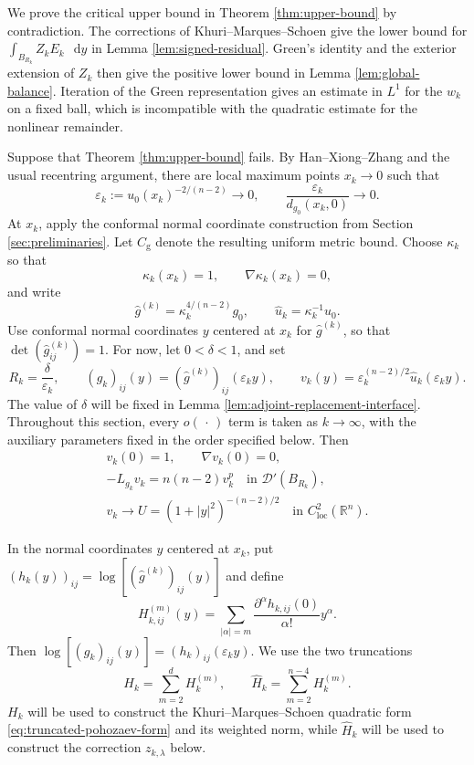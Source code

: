 \documentclass[11pt]{article}
\numberwithin{equation}{section}
\theoremstyle{remark}
\newcommand{\R}{\mathbb R}
\newcommand{\dd}{\mathop{}\!\mathrm{d}}
\begin{document}
{
We prove the critical upper bound in
Theorem  \ref{thm:upper-bound} by contradiction. The corrections of
Khuri--Marques--Schoen give the lower bound for
\(\int_{B_{R_k}}Z_kE_k\,\dd y\) in
Lemma  \ref{lem:signed-residual}. Green's identity and the exterior
extension of \(Z_k\) then give the positive lower bound in
Lemma  \ref{lem:global-balance}. Iteration of the Green representation
gives an estimate in \(L^1\) for the \(w_k\) on a fixed ball, which is
incompatible with the quadratic estimate for the nonlinear remainder.

Suppose that Theorem  \ref{thm:upper-bound} fails.  By
Han--Xiong--Zhang \cite[Lemma  2.2]{HanXiongZhang} and the usual recentring
argument, there are local maximum points \(x_k\to0\) such that
\[
 \varepsilon_k:=u_0(x_k)^{-2/(n-2)}\to0,
 \qquad
 \frac{\varepsilon_k}{d_{g_0}(x_k,0)}\to0.
\]
At \(x_k\), apply the conformal normal coordinate construction from
Section  \ref{sec:preliminaries}.  Let \(C_{\mathrm g}\)
denote the resulting uniform metric bound.  Choose \(\kappa_k\) so that
\[
 \kappa_k(x_k)=1,\qquad \nabla\kappa_k(x_k)=0,
\]
and write
\[
 \widehat g^{(k)}=\kappa_k^{4/(n-2)}g_0,\qquad
 \widehat u_k=\kappa_k^{-1}u_0.
\]
Use conformal normal coordinates $y$ centered at \(x_k\) for
\(\widehat g^{(k)}\), so that \(\det(\widehat g^{(k)}_{ij})=1\).
For now, let \(0<\delta<1\), and set
\[
 R_k=\frac{\delta}{\varepsilon_k},\qquad
 (g_k)_{ij}(y)=(\widehat g^{(k)})_{ij}(\varepsilon_ky),\qquad
 v_k(y)=\varepsilon_k^{(n-2)/2}\widehat u_k(\varepsilon_ky).
\]
The value of \(\delta\) will be fixed in
Lemma  \ref{lem:adjoint-replacement-interface}.
Throughout this section, every \(o(\,\cdot\,)\) term is
taken as \(k\to\infty\), with the auxiliary parameters fixed in the order
specified below.
Then
\begin{equation}\label{eq:short-bubble-limit}
\begin{gathered}
 v_k(0)=1,\qquad \nabla v_k(0)=0,\\
 -L_{g_k}v_k=n(n-2)v_k^p
 \quad\text{in }\mathcal D'(B_{R_k}),\\
 v_k\to U=(1+|y|^2)^{-(n-2)/2}
 \quad\text{in }C^2_{\mathrm{loc}}(\R^n).
\end{gathered}
\end{equation}

In the normal coordinates $y$ centered at \(x_k\), put
\((h_k(y))_{ij}=\log[(\widehat g^{(k)})_{ij}(y)]\) and define
\[
 H_{k,ij}^{(m)}(y)
 =\sum_{|\alpha|=m}
 \frac{\partial^\alpha h_{k,ij}(0)}{\alpha!}y^\alpha.
\]
Then \(\log [(g_k)_{ij}(y)]=(h_k)_{ij}(\varepsilon_k y)\). We use the two truncations
\[
 H_k=\sum_{m=2}^dH_k^{(m)},\qquad
 \widehat H_k=\sum_{m=2}^{n-4}H_k^{(m)}.
\]
$H_k$ will be used to construct 
the Khuri--Marques--Schoen quadratic form \eqref{eq:truncated-pohozaev-form} and its weighted norm, while
$\widehat H_k$ will be used to construct the correction $z_{k,\lambda}$ below.

}
\end{document}
